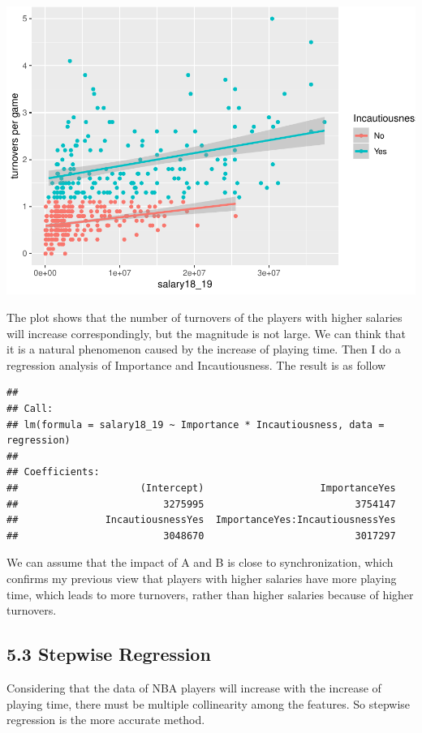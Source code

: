 \documentclass[]{article}
\begin{document}
\includegraphics{Final_Report_files/figure-latex/unnamed-chunk-19-1.pdf}

The plot shows that the number of turnovers of the players with higher
salaries will increase correspondingly, but the magnitude is not large.
We can think that it is a natural phenomenon caused by the increase of
playing time. Then I do a regression analysis of Importance and
Incautiousness. The result is as follow

\begin{verbatim}
## 
## Call:
## lm(formula = salary18_19 ~ Importance * Incautiousness, data = regression)
## 
## Coefficients:
##                     (Intercept)                    ImportanceYes  
##                         3275995                          3754147  
##               IncautiousnessYes  ImportanceYes:IncautiousnessYes  
##                         3048670                          3017297
\end{verbatim}

We can assume that the impact of A and B is close to synchronization,
which confirms my previous view that players with higher salaries have
more playing time, which leads to more turnovers, rather than higher
salaries because of higher turnovers.

\subsection{5.3 Stepwise Regression}\label{stepwise-regression}

Considering that the data of NBA players will increase with the increase
of playing time, there must be multiple collinearity among the features.
So stepwise regression is the more accurate method.
\end{document}
